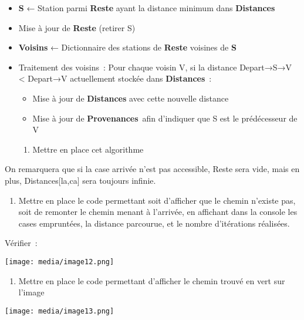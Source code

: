 \documentclass[
]{article}
\begin{document}
\begin{itemize}
\item
  \textbf{S} ← Station parmi \textbf{Reste} ayant la distance minimum
  dans \textbf{Distances}
\item
  Mise à jour de \textbf{Reste} (retirer S)
\item
  \textbf{Voisins} ← Dictionnaire des stations de \textbf{Reste}
  voisines de \textbf{S}
\item
  Traitement des voisins~: Pour chaque voisin V, si la distance
  Depart→S→V \textless{} Depart→V actuellement stockée dans
  \textbf{Distances}~:

  \begin{itemize}
  \item
    Mise à jour de \textbf{Distances} avec cette nouvelle distance
  \item
    Mise à jour de \textbf{Provenances}~afin d'indiquer que S est le
    prédécesseur de V
  \end{itemize}

  \begin{enumerate}
  \def\labelenumi{\arabic{enumi}.}
  \item
    Mettre en place cet algorithme
  \end{enumerate}
\end{itemize}

On remarquera que si la case arrivée n'est pas accessible, Reste sera
vide, mais en plus, Distances{[}la,ca{]} sera toujours infinie.

\begin{enumerate}
\def\labelenumi{\arabic{enumi}.}
\setcounter{enumi}{1}
\item
  Mettre en place le code permettant soit d'afficher que le chemin
  n'existe pas, soit de remonter le chemin menant à l'arrivée, en
  affichant dans la console les cases empruntées, la distance parcourue,
  et le nombre d'itérations réalisées.
\end{enumerate}

Vérifier~:

\texttt{[image: media/image12.png]}

\begin{enumerate}
\def\labelenumi{\arabic{enumi}.}
\setcounter{enumi}{2}
\item
  Mettre en place le code permettant d'afficher le chemin trouvé en vert
  sur l'image
\end{enumerate}

\texttt{[image: media/image13.png]}
\end{document}
